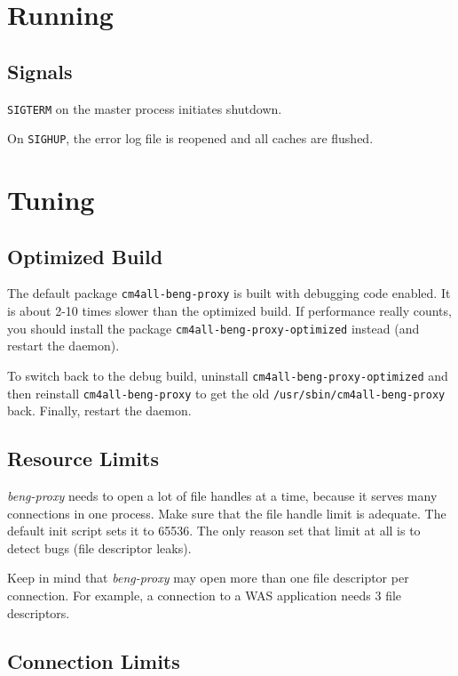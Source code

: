 \documentclass[a4paper,12pt]{article}
\begin{document}
\section{Running}

\subsection{Signals}

\texttt{SIGTERM} on the master process initiates shutdown.

On \texttt{SIGHUP}, the error log file is reopened and all caches are
flushed.


\section{Tuning}

\subsection{Optimized Build}

The default package \texttt{cm4all-beng-proxy} is built with debugging
code enabled.  It is about 2-10 times slower than the optimized build.
If performance really counts, you should install the package
\texttt{cm4all\--beng\--proxy\--optimized} instead (and restart the
daemon).

To switch back to the debug build, uninstall
\texttt{cm4all\--beng\--proxy\--op\-ti\-mi\-zed} and then reinstall
\texttt{cm4all\--beng\--proxy} to get the old
\texttt{/usr/sbin/cm4all\--beng\--proxy} back.  Finally, restart the
daemon.

\subsection{Resource Limits}

\emph{beng-proxy} needs to open a lot of file handles at a time,
because it serves many connections in one process.  Make sure that the
file handle limit is adequate.  The default init script sets it to
65536.  The only reason set that limit at all is to detect bugs (file
descriptor leaks).

Keep in mind that \emph{beng-proxy} may open more than one file
descriptor per connection.  For example, a connection to a WAS
application needs 3 file descriptors.

\subsection{Connection Limits}
\end{document}
